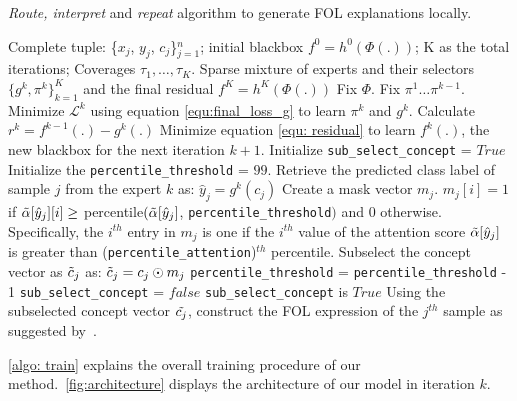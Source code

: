 \begin{algorithm}[h]
   \caption{\emph{Route, interpret} and \emph{repeat} algorithm to generate FOL explanations locally.}
   \label{algo: train}
\begin{algorithmic}[1]
    Complete tuple: \{$x_j$, $y_j$, $c_j$\}$_{j=1}^n$; initial blackbox $f^0 = h^0(\Phi(.))$; K as the total iterations; Coverages $\tau_1, \dots ,\tau_K$.
    Sparse mixture of experts and their selectors $\{g^k, \pi^k\}_{k=1}^K$ and the final residual $f^K = h^K(\Phi(.))$
   \STATE Fix $\Phi$.
       \STATE  Fix $\pi^1 \dots \pi^{k-1}$.
       \STATE Minimize $\mathcal{L}^k$ using equation \ref{equ:final_loss_g} to learn $\pi^k$ and $g^k$.
       \STATE Calculate $r^k = f^{k-1}(.) - g^k(.)$
       \STATE Minimize equation \ref{equ: residual} to learn $f^k(.)$, the new blackbox for the next iteration $k+1$.
       \ENDFOR
                \REPEAT
                    \STATE Initialize \texttt{sub\_select\_concept} = $True$
                    \STATE Initialize the \texttt{percentile\_threshold} = $99$.
                    \STATE Retrieve the predicted class label of sample $j$ from the expert $k$ as: $\hat{y}_j = g^k(c_j)$
                    \STATE Create a mask vector $m_j$. $m_j[i] = 1$ if 
                    $\Tilde{\alpha}[\hat{y}_j][i] \geq$ percentile$(\Tilde{\alpha}[\hat{y}_j]$, \texttt{percentile\_threshold}$)$ and $0$ otherwise. Specifically, the $i^{th}$ entry in $m_j$ is one if the $i^{th}$ value of the attention score $\Tilde{\alpha}[\hat{y}_j]$ is greater than (\texttt{percentile\_attention})$^{th}$ percentile. 
                    \STATE Subselect the concept vector as $\Tilde{c}_j$ as: $\Tilde{c}_j = c_j\odot m_j$
                        \STATE \texttt{percentile\_threshold} = \texttt{percentile\_threshold} - 1
                        \STATE \texttt{sub\_select\_concept} = $false$
                    \ENDIF
                \UNTIL \texttt{sub\_select\_concept} is $True$
                \STATE Using the subselected concept vector $\Tilde{c_j}$, construct the FOL expression of the $j^{th}$ sample as suggested by~\cite{barbiero2022entropy}.
            \ENDFOR
    \ENDFOR
\end{algorithmic}
\end{algorithm}

\cref{algo: train} explains the overall training procedure of our method.~\cref{fig:architecture} displays the architecture of our model in iteration $k$.


